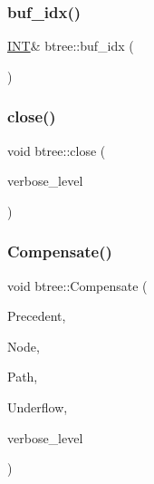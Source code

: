 \subsubsection{\texorpdfstring{buf\+\_\+idx()}{buf\_idx()}}
{\footnotesize\ttfamily \mbox{\hyperlink{galois_8h_a09fddde158a3a20bd2dcadb609de11dc}{I\+NT}}\& btree\+::buf\+\_\+idx (\begin{DoxyParamCaption}{ }\end{DoxyParamCaption})\hspace{0.3cm}{\ttfamily [inline]}}

\mbox{\label{classbtree_acdd59b8696e09dc1c76356902fb35cbd}} 
\subsubsection{\texorpdfstring{close()}{close()}}
{\footnotesize\ttfamily void btree\+::close (\begin{DoxyParamCaption}\item[{\mbox{\hyperlink{galois_8h_a09fddde158a3a20bd2dcadb609de11dc}{I\+NT}}}]{verbose\+\_\+level }\end{DoxyParamCaption})}

\mbox{\label{classbtree_ae778b7f97622e4511e84b543343b6024}} 
\subsubsection{\texorpdfstring{Compensate()}{Compensate()}}
{\footnotesize\ttfamily void btree\+::\+Compensate (\begin{DoxyParamCaption}\item[{\mbox{\hyperlink{galois_8h_a09fddde158a3a20bd2dcadb609de11dc}{I\+NT}}}]{Precedent,  }\item[{\mbox{\hyperlink{galois_8h_a09fddde158a3a20bd2dcadb609de11dc}{I\+NT}}}]{Node,  }\item[{\mbox{\hyperlink{galois_8h_a09fddde158a3a20bd2dcadb609de11dc}{I\+NT}}}]{Path,  }\item[{\mbox{\hyperlink{galois_8h_a09fddde158a3a20bd2dcadb609de11dc}{I\+NT}} \&}]{Underflow,  }\item[{\mbox{\hyperlink{galois_8h_a09fddde158a3a20bd2dcadb609de11dc}{I\+NT}}}]{verbose\+\_\+level }\end{DoxyParamCaption})}

